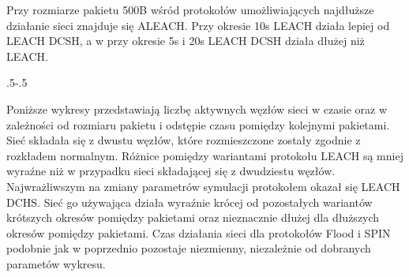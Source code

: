 Przy rozmiarze pakietu 500B wśród protokołów umożliwiających najdłuższe działanie sieci znajduje się ALEACH. Przy okresie 10s LEACH działa lepiej od LEACH DCSH, a w przy okresie 5s i 20s LEACH DCSH działa dłużej niż LEACH.

\clearpage
\thispagestyle{empty}

 {\pdfpagewidth
    \vspace*{-2cm}
    \noindent\kern.5\pdfpagewidth{}\kern-.5\pdfpagewidth
     \par
     \vspace*{-5cm}
\clearpage
\thispagestyle{empty}
    \vspace*{-2cm}
    \noindent\parbox{\textwidth}{%
    \noindent{}\endgraf
    \vspace{2ex}%
    }
     \par
     \vspace*{-5cm}
\clearpage
}

Poniższe wykresy przedstawiają liczbę aktywnych węzłów sieci w czasie oraz w zależności od rozmiaru pakietu i odstępie czasu pomiędzy kolejnymi pakietami. Sieć składała się z dwustu węzłów, które rozmieszczone zostały zgodnie z rozkładem normalnym. Różnice pomiędzy wariantami protokołu LEACH są mniej wyraźne niż w przypadku sieci składającej się z dwudziestu węzłów. Najwrażliwszym na zmiany parametrów symulacji protokołem okazał się LEACH DCHS. Sieć go używająca działa wyraźnie krócej od pozostałych wariantów krótszych okresów pomiędzy pakietami oraz nieznacznie dłużej dla dłuższych okresów pomiędzy pakietami. Czas działania sieci dla protokołów Flood i SPIN podobnie jak w poprzednio pozostaje niezmienny, niezależnie od dobranych parametów wykresu.

\clearpage
\thispagestyle{empty}

